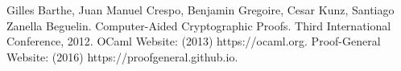 \documentclass[runningheads]{llncs}
\begin{document}
%
%
%
%
% 
% 
%
\begin{thebibliography}{8}
Gilles Barthe, Juan Manuel Crespo, Benjamin Gregoire, Cesar Kunz, Santiago Zanella Beguelin. Computer-Aided Cryptographic Proofs. Third International Conference, 2012.
OCaml Website: (2013) https://ocaml.org.
Proof-General Website: (2016) https://proofgeneral.github.io.
\end{thebibliography}
\end{document}
